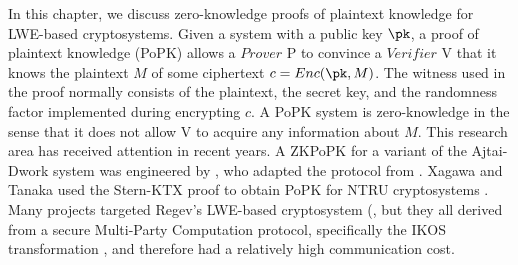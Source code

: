 In this chapter, we discuss zero-knowledge proofs of plaintext knowledge for
LWE-based cryptosystems. Given a system with a public key $\pk$, a proof of
plaintext knowledge (PoPK) allows a $Prover$ P to convince a $Verifier$ V that
it knows the plaintext $M$ of some ciphertext $c = Enc(\pk, M)$. The witness
used in the proof normally consists of the plaintext, the secret key, and the
randomness factor implemented during encrypting $c$. A PoPK system is
zero-knowledge in the sense that it does not allow V to acquire any information
about $M$. This research area has received attention in recent years. A ZKPoPK
for a variant of the Ajtai-Dwork system \cite{ajtai1997public} was engineered by
\cite{goldreich1999approximating}, who adapted the protocol from
\cite{micciancio2003statistical}. Xagawa and Tanaka \cite{xagawa2009zero} used
the Stern-KTX proof \cite{stern1993new, kawachi2008concurrently} to obtain PoPK
for NTRU cryptosystems \cite{hoffstein1998ntru}. Many projects targeted Regev's
LWE-based cryptosystem (\cite{bendlin2010threshold, bendlin2011semi,
  asharov2012multiparty}, but they all derived from a secure Multi-Party
Computation protocol, specifically the IKOS transformation \cite{ishai2007zero},
and therefore had a relatively high communication cost. 






